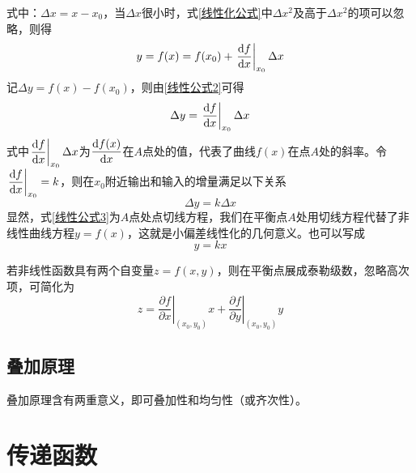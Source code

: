 式中：$\Delta x = x - x_0$，当$\Delta x$很小时，式\eqref{线性化公式}中$\Delta x^2$及高于$\Delta x^2$的项可以忽略，则得
\begin{equation}
	y=f(x)=f(x_0)+\left. \frac{{\rm{d}} f}{{\rm{d}} x}\right|_{x_0}\Delta x
	\label{线性公式2}
\end{equation}
记$\Delta y = f(x)- f(x_0)$，则由\eqref{线性公式2}可得
\begin{equation}
	\Delta y = \left. \frac{{\rm{d}} f}{{\rm{d}} x}\right|_{x_0}\Delta x
\end{equation}
式中$\displaystyle \left. \frac{{\rm{d}} f}{{\rm{d}} x}\right|_{x_0}\Delta x$为$\dfrac{{\rm{d}} f(x)}{{\rm{d}} x}$在$A$点处的值，代表了曲线$f(x)$在点$A$处的斜率。令$\left. \dfrac{{\rm{d}} f}{{\rm{d}} x}\right|_{x_0} = k$，则在$x_0$附近输出和输入的增量满足以下关系
\begin{equation}
	\Delta y = k \Delta x
	\label{线性公式3}
\end{equation}
显然，式\eqref{线性公式3}为$A$点处点切线方程，我们在平衡点$A$处用切线方程代替了非线性曲线方程$y=f(x)$，这就是小偏差线性化的几何意义。也可以写成
\begin{equation}
	y = kx
\end{equation}

\theorem[多元函数的小偏差线性化]
若非线性函数具有两个自变量$z=f(x,y)$，则在平衡点展成泰勒级数，忽略高次项，可简化为
\begin{equation}
	z = \left. \frac{\partial f}{\partial x} \right|_{(x_0,y_0)} x + \left. \frac{\partial f}{\partial y} \right|_{(x_0,y_0)} y
\end{equation}

\subsection{叠加原理}

叠加原理含有两重意义，即可叠加性和均匀性（或齐次性）。



\section{传递函数}
